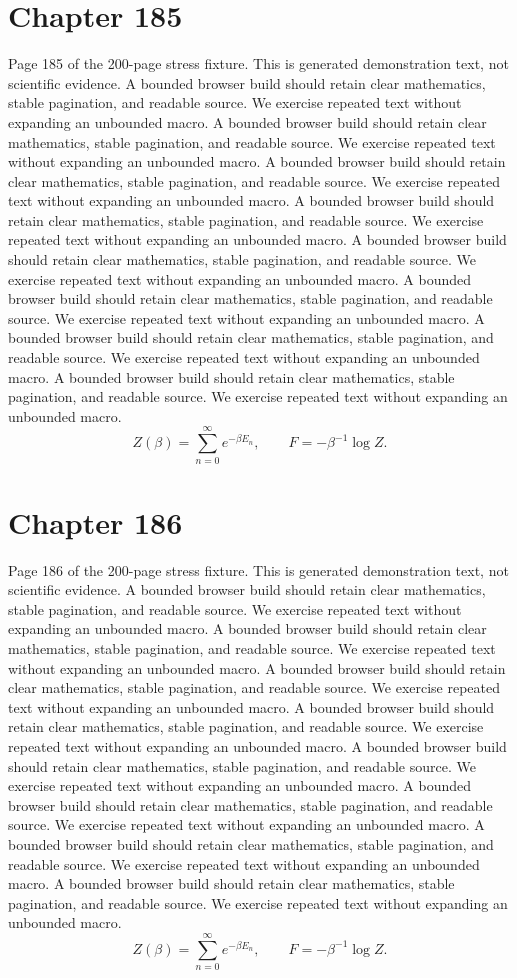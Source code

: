 \documentclass[11pt]{article}
\begin{document}
\section*{Chapter 185}
Page 185 of the 200-page stress fixture. This is generated demonstration text, not scientific evidence.
A bounded browser build should retain clear mathematics, stable pagination, and readable source. We exercise repeated text without expanding an unbounded macro.
A bounded browser build should retain clear mathematics, stable pagination, and readable source. We exercise repeated text without expanding an unbounded macro.
A bounded browser build should retain clear mathematics, stable pagination, and readable source. We exercise repeated text without expanding an unbounded macro.
A bounded browser build should retain clear mathematics, stable pagination, and readable source. We exercise repeated text without expanding an unbounded macro.
A bounded browser build should retain clear mathematics, stable pagination, and readable source. We exercise repeated text without expanding an unbounded macro.
A bounded browser build should retain clear mathematics, stable pagination, and readable source. We exercise repeated text without expanding an unbounded macro.
A bounded browser build should retain clear mathematics, stable pagination, and readable source. We exercise repeated text without expanding an unbounded macro.
A bounded browser build should retain clear mathematics, stable pagination, and readable source. We exercise repeated text without expanding an unbounded macro.
\[Z(\beta)=\sum_{n=0}^{\infty}e^{-\beta E_n},\qquad F=-\beta^{-1}\log Z.\]
\newpage
\section*{Chapter 186}
Page 186 of the 200-page stress fixture. This is generated demonstration text, not scientific evidence.
A bounded browser build should retain clear mathematics, stable pagination, and readable source. We exercise repeated text without expanding an unbounded macro.
A bounded browser build should retain clear mathematics, stable pagination, and readable source. We exercise repeated text without expanding an unbounded macro.
A bounded browser build should retain clear mathematics, stable pagination, and readable source. We exercise repeated text without expanding an unbounded macro.
A bounded browser build should retain clear mathematics, stable pagination, and readable source. We exercise repeated text without expanding an unbounded macro.
A bounded browser build should retain clear mathematics, stable pagination, and readable source. We exercise repeated text without expanding an unbounded macro.
A bounded browser build should retain clear mathematics, stable pagination, and readable source. We exercise repeated text without expanding an unbounded macro.
A bounded browser build should retain clear mathematics, stable pagination, and readable source. We exercise repeated text without expanding an unbounded macro.
A bounded browser build should retain clear mathematics, stable pagination, and readable source. We exercise repeated text without expanding an unbounded macro.
\[Z(\beta)=\sum_{n=0}^{\infty}e^{-\beta E_n},\qquad F=-\beta^{-1}\log Z.\]
\newpage
\end{document}
